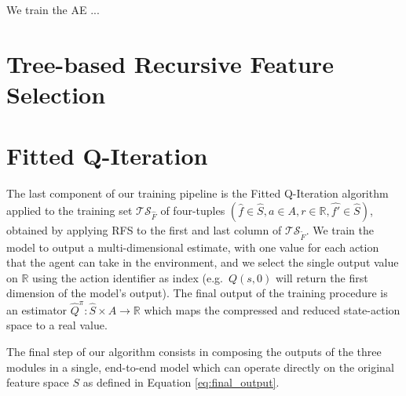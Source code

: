 We train the AE ...

\section{Tree-based Recursive Feature Selection}

\section{Fitted Q-Iteration}
The last component of our training pipeline is the Fitted Q-Iteration algorithm 
applied to the training set $\mathcal{TS}_{\hat{F}}$ of four-tuples
$(\hat{f} \in \hat{S}, a \in A, r \in \mathbb{R}, \hat{f'} \in \hat{S})$, 
obtained by applying RFS to the first and last column of 
$\mathcal{TS}_{\tilde{F}}$. 
We train the model to output a multi-dimensional estimate, with one value for 
each action that the agent can take in the environment, and we select the single
output value on $\mathbb{R}$ using the action identifier as index (e.g.\ 
$Q(s, 0)$ will return the first dimension of the model's output). 
The final output of the training procedure is an estimator 
$\hat{Q}^\pi: \hat{S} \times A \rightarrow \mathbb{R}$ which maps the compressed
and reduced state-action space to a real value. 

 
The final step of our algorithm consists in composing the outputs of the three 
modules in a single, end-to-end model which can operate directly on the original
feature space $S$ as defined in Equation \eqref{eq:final_output}.
